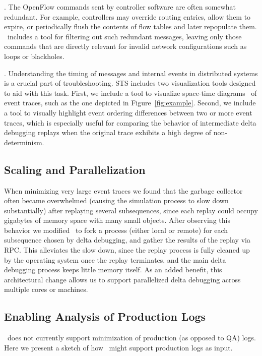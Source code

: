 . The OpenFlow commands sent by controller software
are often somewhat redundant. For example, controllers may override routing
entries, allow them to expire, or periodically flush the
contents of flow tables and later repopulate them. \projectname~includes a
tool for filtering out such redundant messages,
leaving only those commands that are directly relevant for invalid network
configurations such as loops or blackholes.

. Understanding the timing of messages and internal
events in distributed systems is a crucial part of troubleshooting.
STS includes two visualization tools designed to aid with this task. First, we
include a tool to visualize space-time diagrams~\cite{Lamport:1978:TCO:359545.359563}
of event traces, such as the one depicted in Figure~\ref{fig:example}.
Second, we include a tool to visually highlight event ordering differences
between two or more event traces, which is especially useful for comparing the behavior of
intermediate delta debugging replays when the original trace exhibits a high degree of non-determinism.

\subsection{Scaling and Parallelization}

When minimizing very large event traces we found that the garbage
collector often became overwhelmed (causing the simulation process to slow down
substantially) after replaying several subsequences, since each replay could
occupy gigabytes of memory space with many small objects.
After observing this behavior we modified \projectname~to fork a process
(either local or remote) for each subsequence chosen by delta debugging,
and gather the results of the replay via RPC. This alleviates the slow down,
since the replay process is fully cleaned up by the operating system once the
replay terminates, and the
main delta debugging process keeps little memory itself.
As an added benefit, this architectural change allows us to support
parallelized delta debugging across multiple cores or machines.

\subsection{Enabling Analysis of Production Logs}

\projectname~does not currently support minimization of production (as opposed
to QA) logs.
Here we present a sketch of how \projectname~might support production logs as input.

